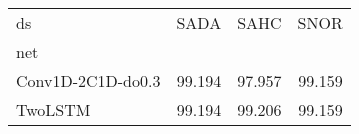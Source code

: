 \begin{tabular}{lrrr}
\toprule
ds &   SADA &   SAHC &   SNOR \\
net               &        &        &        \\
\midrule
Conv1D-2C1D-do0.3 & 99.194 & 97.957 & 99.159 \\
TwoLSTM           & 99.194 & 99.206 & 99.159 \\
\bottomrule
\end{tabular}
